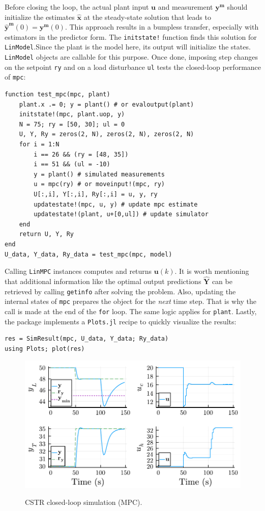 Before closing the loop, the actual plant input $\mathbf{u}$ and measurement $\mathbf{y^m}$ should initialize the estimates $\mathbf{\hat{x}}$ at the steady-state solution that leads to $\mathbf{\hat{y}^m}(0)=\mathbf{y^m}(0)$. This approach results in a bumpless transfer, especially with estimators in the predictor form. The \texttt{initstate!} function finds this solution for \texttt{LinModel}.Since the plant is the model here, its output will initialize the states. \texttt{LinModel} objects are callable for this purpose. Once done, imposing step changes on the setpoint \texttt{ry} and on a load disturbance \texttt{ul} tests the closed-loop performance of \texttt{mpc}:
\begin{verbatim}
function test_mpc(mpc, plant)
    plant.x .= 0; y = plant() # or evaloutput(plant)
    initstate!(mpc, plant.uop, y)
    N = 75; ry = [50, 30]; ul = 0
    U, Y, Ry = zeros(2, N), zeros(2, N), zeros(2, N)
    for i = 1:N
        i == 26 && (ry = [48, 35])
        i == 51 && (ul = -10)
        y = plant() # simulated measurements
        u = mpc(ry) # or moveinput!(mpc, ry)
        U[:,i], Y[:,i], Ry[:,i] = u, y, ry
        updatestate!(mpc, u, y) # update mpc estimate
        updatestate!(plant, u+[0,ul]) # update simulator
    end
    return U, Y, Ry
end
U_data, Y_data, Ry_data = test_mpc(mpc, model)
\end{verbatim}
Calling \texttt{LinMPC} instances computes and returns $\mathbf{u}(k)$. It is worth mentioning that additional information like the optimal output predictions $\mathbf{\hat{Y}}$ can be retrieved by calling \texttt{getinfo} after solving the problem. Also, updating the internal states of \texttt{mpc} prepares the object for the \emph{next} time step. That is why the call is made at the end of the \texttt{for} loop. The same logic applies for \texttt{plant}. Lastly, the package implements a \texttt{Plots.jl} recipe \citep{plots} to quickly visualize the results:
\begin{verbatim}
res = SimResult(mpc, U_data, Y_data; Ry_data)
using Plots; plot(res)
\end{verbatim}

\begin{figure}[b]
    \centering
    \caption{CSTR closed-loop simulation (MPC).}
    \includegraphics[width=0.5\columnwidth]{fig/plot_LinMPC1.pdf}
    \label{fig:plot_LinMPC1}
\end{figure}

